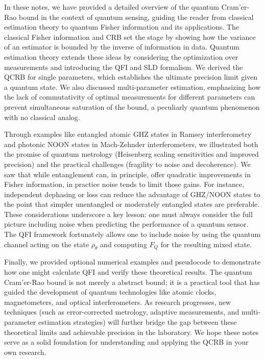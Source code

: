 In these notes, we have provided a detailed overview of the quantum
Cram'er-Rao bound in the context of quantum sensing, guiding the
reader from classical estimation theory to quantum Fisher information
and its applications. The classical Fisher information and CRB set the
stage by showing how the variance of an estimator is bounded by the
inverse of information in data. Quantum estimation theory extends
these ideas by considering the optimization over measurements and
introducing the QFI and SLD formalism. We derived the QCRB for single
parameters, which establishes the ultimate precision limit given a
quantum state. We also discussed multi-parameter estimation,
emphasizing how the lack of commutativity of optimal measurements for
different parameters can prevent simultaneous saturation of the bound,
a peculiarly quantum phenomenon with no classical analog.



Through examples like entangled atomic GHZ states in Ramsey
interferometry and photonic NOON states in Mach-Zehnder
interferometers, we illustrated both the promise of quantum metrology
(Heisenberg scaling sensitivities and improved precision) and the
practical challenges (fragility to noise and decoherence). We saw that
while entanglement can, in principle, offer quadratic improvements in
Fisher information, in practice noise tends to limit those gains. For
instance, independent dephasing or loss can reduce the advantage of
GHZ/NOON states to the point that simpler unentangled or moderately
entangled states are preferable. These considerations underscore a key
lesson: one must always consider the full picture including noise when
predicting the performance of a quantum sensor. The QFI framework
fortunately allows one to include noise by using the quantum channel
acting on the state $\rho_\theta$ and computing $F_Q$ for the
resulting mixed state.



Finally, we provided optional numerical examples and pseudocode to
demonstrate how one might calculate QFI and verify these theoretical
results. The quantum Cram'er-Rao bound is not merely a abstract bound;
it is a practical tool that has guided the development of quantum
technologies like atomic clocks, magnetometers, and optical
interferometers. As research progresses, new techniques (such as
error-corrected metrology, adaptive measurements, and multi-parameter
estimation strategies) will further bridge the gap between these
theoretical limits and achievable precision in the laboratory. We hope
these notes serve as a solid foundation for understanding and applying
the QCRB in your own research.



